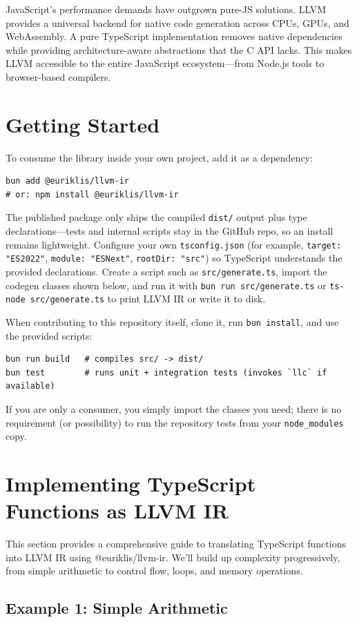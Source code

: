 \documentclass[11pt]{article}
\begin{document}
JavaScript's performance demands have outgrown pure-JS solutions. LLVM provides a universal backend for native code generation across CPUs, GPUs, and WebAssembly. A pure TypeScript implementation removes native dependencies while providing architecture-aware abstractions that the C API lacks. This makes LLVM accessible to the entire JavaScript ecosystem—from Node.js tools to browser-based compilers.

\section{Getting Started}
To consume the library inside your own project, add it as a dependency:
\begin{lstlisting}[style=ts]
bun add @euriklis/llvm-ir
# or: npm install @euriklis/llvm-ir
\end{lstlisting}
The published package only ships the compiled \texttt{dist/} output plus type declarations—tests and internal scripts stay in the GitHub repo, so an install remains lightweight. Configure your own \texttt{tsconfig.json} (for example, \texttt{target: "ES2022"}, \texttt{module: "ESNext"}, \texttt{rootDir: "src"}) so TypeScript understands the provided declarations. Create a script such as \texttt{src/generate.ts}, import the codegen classes shown below, and run it with \texttt{bun run src/generate.ts} or \texttt{ts-node src/generate.ts} to print LLVM IR or write it to disk.

When contributing to this repository itself, clone it, run \texttt{bun install}, and use the provided scripts:
\begin{lstlisting}[style=ts]
bun run build   # compiles src/ -> dist/
bun test        # runs unit + integration tests (invokes `llc` if available)
\end{lstlisting}
If you are only a consumer, you simply import the classes you need; there is no requirement (or possibility) to run the repository tests from your \texttt{node\_modules} copy.

\section{Implementing TypeScript Functions as LLVM IR}
This section provides a comprehensive guide to translating TypeScript functions into LLVM IR using @euriklis/llvm-ir. We'll build up complexity progressively, from simple arithmetic to control flow, loops, and memory operations.

\subsection{Example 1: Simple Arithmetic}
\end{document}
